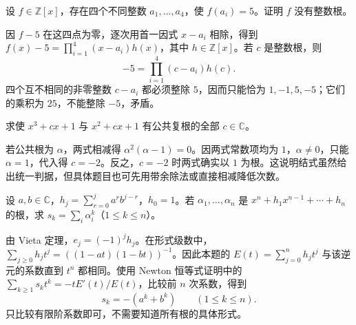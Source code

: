 \begin{example}
\label{ex:poly-training-integer-root}
设 $f\in\mathbb Z[x]$，存在四个不同整数 $a_1,\ldots,a_4$，使 $f(a_i)=5$。证明 $f$ 没有整数根。
\end{example}
\begin{solve}
因 $f-5$ 在这四点为零，逐次用首一因式 $x-a_i$ 相除，得到 $f(x)-5=\prod_{i=1}^4(x-a_i)h(x)$，其中 $h\in\mathbb Z[x]$。若 $c$ 是整数根，则
\[
    -5=\prod_{i=1}^4(c-a_i)h(c).
\]
四个互不相同的非零整数 $c-a_i$ 都必须整除 $5$，因而只能恰为 $1,-1,5,-5$；它们的乘积为 $25$，不能整除 $-5$，矛盾。
\end{solve}

\begin{example}
\label{ex:poly-training-parameter-common-root}
求使 $x^3+cx+1$ 与 $x^2+cx+1$ 有公共复根的全部 $c\in\mathbb C$。
\end{example}
\begin{solve}
若公共根为 $\alpha$，两式相减得 $\alpha^2(\alpha-1)=0$。因两式常数项均为 $1$，$\alpha\ne0$，只能 $\alpha=1$，代入得 $c=-2$。反之，$c=-2$ 时两式确实以 $1$ 为根。这说明结式虽然给出统一判据，但具体题目也可先用带余除法或直接相减降低次数。
\end{solve}

\begin{example}
\label{ex:poly-training-power-sums}
设 $a,b\in\mathbb C$，$h_j=\sum_{r=0}^j a^rb^{j-r}$，$h_0=1$。若 $\alpha_1,\ldots,\alpha_n$ 是 $x^n+h_1x^{n-1}+\cdots+h_n$ 的根，求 $s_k=\sum_i\alpha_i^k$（$1\leq k\leq n$）。
\end{example}
\begin{solve}
由 Vieta 定理，$e_j=(-1)^jh_j$。在形式级数中，$\sum_{j\geq0}h_jt^j=((1-at)(1-bt))^{-1}$。因此本题的 $E(t)=\sum_{j=0}^nh_jt^j$ 与该逆元的系数直到 $t^n$ 都相同。使用 Newton 恒等式证明中的 $\sum_{k\geq1}s_kt^k=-tE'(t)/E(t)$，比较前 $n$ 次系数，得到
\[
    s_k=-(a^k+b^k)\qquad(1\leq k\leq n).
\]
只比较有限阶系数即可，不需要知道所有根的具体形式。
\end{solve}





